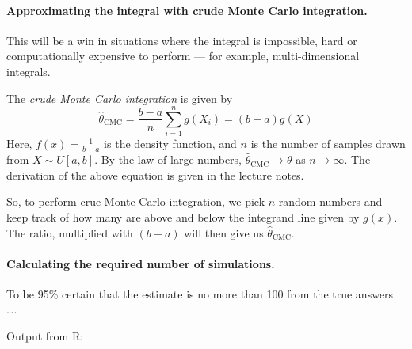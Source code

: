 \documentclass[a4paper,english,12pt]{article}
\begin{document}
\paragraph{Approximating the integral with crude Monte Carlo integration.}

This will be a win in situations where the integral is impossible, hard or
computationally expensive to perform --- for example, multi-dimensional
integrals.

The \textit{crude Monte Carlo integration} is given by
\[
  \hat{\theta}_{\textrm{CMC}} = \frac{b-a}{n} \sum_{i=1}^{n} g(X_i) =
  (b-a)\overline{g(X)}
\]
Here, $f(x) = \frac{1}{b-a}$ is the density function, and $n$ is the number of
samples drawn from $X \sim U[a,b]$. By the law of large numbers,
$\hat{\theta}_{\textrm{CMC}} \to \theta$ as $n \to \infty$. The derivation of the above
equation is given in the lecture notes.

So, to perform crue Monte Carlo integration, we pick $n$ random numbers and
keep track of how many are above and below the integrand line given by $g(x)$.
The ratio, multiplied with $(b-a)$ will then give us
$\hat{\theta}_{\textrm{CMC}}$.

\paragraph{Calculating the required number of simulations.}
To be 95\%{} certain that the estimate is no more than 100 from the true
answers \dots.

Output from R:


\clearpage


\end{document}
